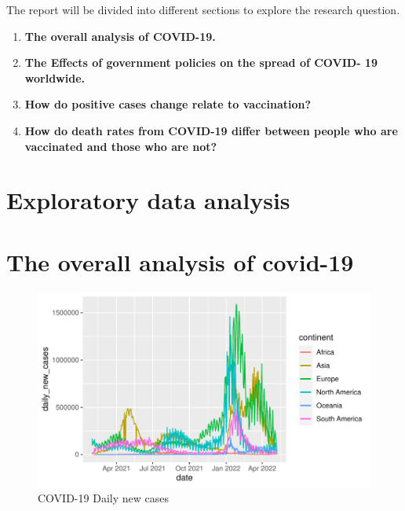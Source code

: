 \documentclass[11pt,a4paper,]{article}
\begin{document}
The report will be divided into different sections to explore the research question.

\begin{enumerate}
\def\labelenumi{(\arabic{enumi})}
\item
  \textbf{The overall analysis of COVID-19.}
\item
  \textbf{The Effects of government policies on the spread of COVID- 19 worldwide.}
\item
  \textbf{How do positive cases change relate to vaccination?}
\item
  \textbf{How do death rates from COVID-19 differ between people who are vaccinated and those who are not?}
\end{enumerate}

\clearpage

\hypertarget{exploratory-data-analysis}{%
\section{\texorpdfstring{\textbf{Exploratory data analysis}}{Exploratory data analysis}}\label{exploratory-data-analysis}}

\section*{The overall analysis of covid-19}

\begin{figure}

{\centering \includegraphics{report_files/figure-latex/Figure1-1} 

}

\caption{COVID-19 Daily new cases}\label{fig:Figure1}
\end{figure}
\end{document}

